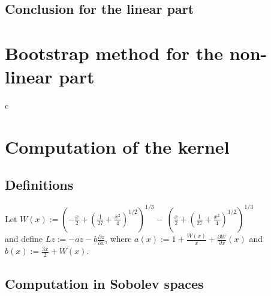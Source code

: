 \documentclass[11pt,a4paper]{article}
\begin{document}
\subsection{Conclusion for the linear part}





\section{Bootstrap method for the non-linear part}
c
\newpage
\printbibliography[heading=bibintoc]
\newpage
\appendix
\section{Computation of the kernel}

\subsection{Definitions}

Let $W(x) := \left( -\frac{x}{2} + \left( \frac{1}{27} + \frac{x^2}{4} \right)^{1/2} \right)^{1/3} -\  \left( \frac{x}{2} + \left( \frac{1}{27} + \frac{x^2}{4} \right)^{1/2} \right)^{1/3}$ \\


and define $Lz := -az - b\frac{\partial z}{\partial x} $, where $a(x):= 1+\frac{W(x)}{x}+\frac{\partial W}{\partial x} (x)$ and $b(x):= \frac{3x}{2} + W(x)$.

\subsection{Computation in Sobolev spaces}
\end{document}
